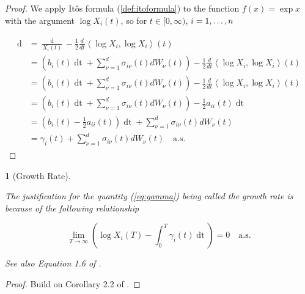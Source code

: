 \documentclass[british]{amsart}
\numberwithin{equation}{section}
\numberwithin{figure}{section}
\theoremstyle{plain}
\newtheorem{thm}{\protect\theoremname}[section]
\theoremstyle{definition}
\theoremstyle{plain}
\theoremstyle{plain}
\theoremstyle{plain}
\theoremstyle{remark}
\theoremstyle{plain}
\providecommand{\theoremname}{Theorem}
\renewcommand{\d}[1]{\mathop{\mathrm{d}{#1}}}
\newcommand{\ranget}{t\in[0,\infty)}
\newcommand{\almostsurely}{\text{a.s.}}
\begin{document}
\begin{proof}
	We apply It\^{o}s formula (\ref{def:itoformula}) to the function $f(x)=\exp{x}$ with the argument $\log{X_{i}(t)}$, so for $\ranget$, $i=1,\dots,n$

	\begin{gather*}
		\begin{split}
			\d{\log{X_{i}(t)}} 
			 	& = 
					\frac{\d{X_{i}(t)}}{X_{i}(t)} - 
						\frac{1}{2} \frac{d}{dt}\left\langle \log X_{i},\log X_{i}\right\rangle(t)
					\\
				& = 
					\left(
						b_{i}(t)\d{t} + 
						\sum_{\nu=1}^{d} \sigma_{i\nu}(t) dW_{\nu}(t)
					\right)- 
					\frac{1}{2} \frac{d}{dt}\left\langle \log X_{i},\log X_{i}\right\rangle(t)
					\\
				& = 
					\left(
						b_{i}(t)\d{t} + 
						\sum_{\nu=1}^{d} \sigma_{i\nu}(t) dW_{\nu}(t)
					\right)- 
					\frac{1}{2} \frac{d}{dt}\left\langle \log X_{i},\log X_{i}\right\rangle(t)
					\\
				& = 
					\left(
						b_{i}(t)\d{t} + 
						\sum_{\nu=1}^{d} \sigma_{i\nu}(t) dW_{\nu}(t)
					\right)- 
					\frac{1}{2} a_{ii}(t)\d{t}
					\\
				& = 
					\left(
						b_{i}(t) -
						\frac{1}{2} a_{ii}(t)
					\right) \d{t} +
					\sum_{\nu=1}^{d} \sigma_{i\nu}(t) dW_{\nu}(t)
					\\
				& = 
					\gamma_{i}(t) +
					\sum_{\nu=1}^{d} \sigma_{i\nu}(t) dW_{\nu}(t)
				\quad \almostsurely
		\end{split}
	\end{gather*}


\end{proof}

\begin{thm} [Growth Rate]
	\label{thm:growthrate}


	The justification for the quantity (\ref{eq:gamma}) being called the 
	\textit{growth rate} is	because of the following relationship

	\begin{equation}
		\lim_{T \to \infty} 
			\left( 
			\log{X_{i}(T)} - \int_{0}^{T} \gamma_{i}(t)\d{t} 
			\right) = 0
		\quad \almostsurely
	\end{equation}

	See also Equation 1.6 of \cite{fernholz2009}.

\end{thm}

\begin{proof}
	Build on Corollary 2.2 of \cite{fernholz1999}.
\end{proof}
\end{document}
